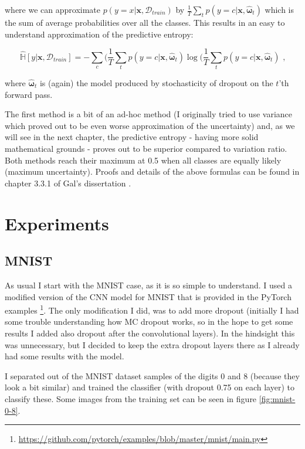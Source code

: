 \documentclass[11pt]{article}
\begin{document}
where we can approximate $p(y = x|\mathbf{x}, \mathcal{D}_{train})$ by $\frac{1}{T} \sum_{t} p(y = c|\mathbf{x}, \mathbf{\hat{\omega}}_t)$ which is the sum of average probabilities over all the classes. This results in an easy to understand approximation of the predictive entropy:

\[
    \mathbb{\hat{H}}[y|\mathbf{x}, \mathcal{D}_{train}] = -\sum_{c}(\frac{1}{T} \sum_{t} p(y = c|\mathbf{x}, \mathbf{\hat{\omega}}_t) \log (\frac{1}{T} \sum_{t} p(y = c|\mathbf{x}, \mathbf{\hat{\omega}}_t) \text{ ,}
\]

where $\mathbf{\hat{\omega}}_t$ is (again) the model produced by stochasticity of dropout on the $t$'th forward pass.

The first method is a bit of an ad-hoc method (I originally tried to use variance which proved out to be even worse approximation of the uncertainty) and, as we will see in the next chapter, the predictive entropy - having more solid mathematical grounds - proves out to be superior compared to variation ratio. Both methods reach their maximum at 0.5 when all classes are equally likely (maximum uncertainty). Proofs and details of the above formulas can be found in chapter 3.3.1 of Gal's dissertation \cite{gal2016uncertainty}.

\section{Experiments}

\subsection{MNIST}

As usual I start with the MNIST case, as it is so simple to understand. I used a modified version of the CNN model for MNIST that is provided in the PyTorch examples \footnote{\url{https://github.com/pytorch/examples/blob/master/mnist/main.py}}. The only modification I did, was to add more dropout (initially I had some trouble understanding how MC dropout works, so in the hope to get some results I added also dropout after the convolutional layers). In the hindsight this was unnecessary, but I decided to keep the extra dropout layers there as I already had some results with the model.

I separated out of the MNIST dataset samples of the digits 0 and 8 (because they look a bit similar) and trained the classifier (with dropout 0.75 on each layer) to classify these. Some images from the training set can be seen in figure \ref{fig:mnist-0-8}.
\end{document}

